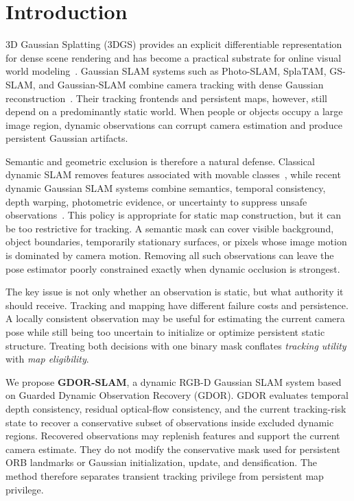 \section{Introduction}

3D Gaussian Splatting (3DGS) provides an explicit differentiable representation for dense scene rendering and has become a practical substrate for online visual world modeling~\cite{kerbl20233dgaussian}.
Gaussian SLAM systems such as Photo-SLAM, SplaTAM, GS-SLAM, and Gaussian-SLAM combine camera tracking with dense Gaussian reconstruction~\cite{huai2024photoSLAM,keetha2024splatam,yan2023gs,yugay2023gaussianslam}.
Their tracking frontends and persistent maps, however, still depend on a predominantly static world.
When people or objects occupy a large image region, dynamic observations can corrupt camera estimation and produce persistent Gaussian artifacts.

Semantic and geometric exclusion is therefore a natural defense.
Classical dynamic SLAM removes features associated with movable classes~\cite{bescos2018dynaslam,yu2018ds,xiao2019dynamic}, while recent dynamic Gaussian SLAM systems combine semantics, temporal consistency, depth warping, photometric evidence, or uncertainty to suppress unsafe observations~\cite{xu2024dgslam,kong2024dgsslam,liu2025dyphoslam,zhang2026dagsslam}.
This policy is appropriate for static map construction, but it can be too restrictive for tracking.
A semantic mask can cover visible background, object boundaries, temporarily stationary surfaces, or pixels whose image motion is dominated by camera motion.
Removing all such observations can leave the pose estimator poorly constrained exactly when dynamic occlusion is strongest.

The key issue is not only whether an observation is static, but what authority it should receive.
Tracking and mapping have different failure costs and persistence.
A locally consistent observation may be useful for estimating the current camera pose while still being too uncertain to initialize or optimize persistent static structure.
Treating both decisions with one binary mask conflates \emph{tracking utility} with \emph{map eligibility}.

We propose \textbf{GDOR-SLAM}, a dynamic RGB-D Gaussian SLAM system based on Guarded Dynamic Observation Recovery (GDOR).
GDOR evaluates temporal depth consistency, residual optical-flow consistency, and the current tracking-risk state to recover a conservative subset of observations inside excluded dynamic regions.
Recovered observations may replenish features and support the current camera estimate.
They do not modify the conservative mask used for persistent ORB landmarks or Gaussian initialization, update, and densification.
The method therefore separates transient tracking privilege from persistent map privilege.


